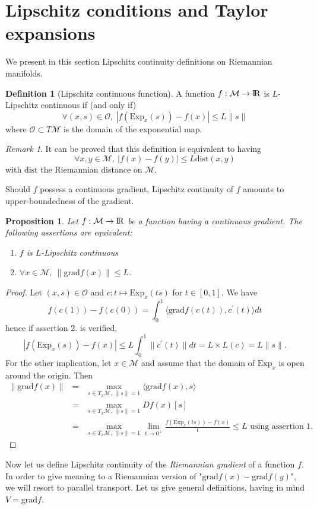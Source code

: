 \documentclass[10pt,a4paper]{book}
\theoremstyle{definition}
\newtheorem{defn}{Definition}[section]
\theoremstyle{plain}
\newtheorem{prop}{Proposition}[section]
\theoremstyle{remark}
\newtheorem{rmk}{Remark}[section]
\newcommand{\grad}{\textrm{grad}}
\newcommand \M {\mathcal{M}}
\def\R{{\rm I\kern-0.16em R}}
\begin{document}
\section{Lipschitz conditions and Taylor expansions}

We present in this section Lipschitz continuity definitions on Riemannian manifolds. 
\begin{defn}[Lipschitz continuous function]
A function $f:\M \to \R$ is $L$-Lipschitz continuous if (and only if)
$$\forall (x,s)\in \mathcal{O},~|f(\text{Exp}_x(s))-f(x)|\leq L\|s\|$$
where $\mathcal{O}\subset T\M$ is the domain of the exponential map.
\end{defn}
\begin{rmk} It can be proved that this definition is equivalent to having
$$\forall x,y \in \M,~|f(x)-f(y)|\leq L\text{dist}(x,y)$$
with $\text{dist}$ the Riemannian distance on $\M$.
\end{rmk}
Should $f$ possess a continuous gradient, Lipschitz continuity of $f$ amounts to upper-boundedness of the gradient.
\begin{prop}
Let $f:\M \to \R$ be a function having a continuous gradient. The following assertions are equivalent:
\begin{enumerate}
\item $f$ is $L$-Lipschitz continuous
\item $\forall x \in \M,~\|\grad f(x)\|\leq L$.
\end{enumerate}
\end{prop}
\begin{proof}
Let $(x,s) \in \mathcal{O}$ and $c:t\mapsto \text{Exp}_x(ts)$ for $t\in [0,1]$.
We have
$$f(c(1))-f(c(0))=\int_0^{1}\langle \grad f(c(t)),c^{\prime}(t)\rangle dt$$ hence if assertion 2. is verified,
$$|f(\text{Exp}_x(s))-f(x)|\leq L\int_0^{1}\|c^{\prime}(t)\|dt=L\times L(c)=L\|s\|.$$
For the other implication, let $x\in \M$ and assume that the domain of $\text{Exp}_x$ is open around the origin. Then
\begin{eqnarray*}
\|\grad f(x)\|&=&\max_{s\in T_x\M,~\|s\|=1}\langle \grad f(x),s\rangle\\
&=& \max_{s\in T_x\M,~\|s\|=1}Df(x)[s]\\
&=&\max_{s\in T_x\M,~\|s\|=1}\lim_{t\to 0^{+}}\frac{f(\text{Exp}_x(ts))-f(x)}{t}\leq L \text{ using assertion }1.
\end{eqnarray*}
\end{proof}
Now let us define Lipschitz continuity of the \emph{Riemannian gradient} of a function $f$. In order to give meaning to a Riemannian version of "$\grad f(x)-\grad f(y)$", we will resort to parallel transport. Let us give general definitions, having in mind $V=\grad f$.
\end{document}
